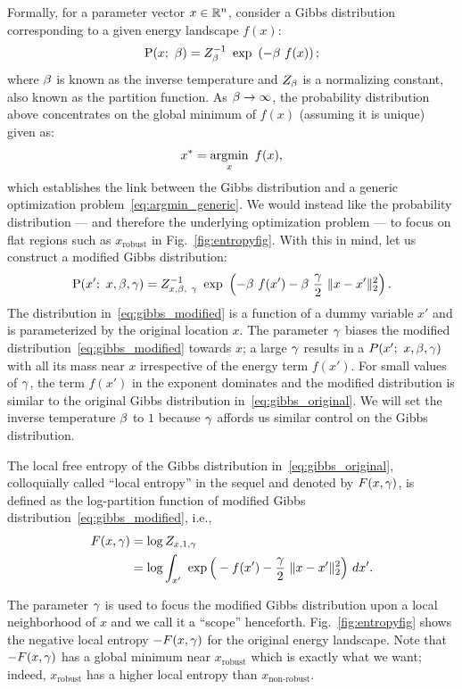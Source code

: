 \documentclass[10pt]{article}
\begin{document}
Formally, for a parameter vector $x \in \mathbb{R}^n$, consider a Gibbs distribution corresponding to a given energy landscape $f(x)$:
\begin{equation}
    \P(x;\ \b) = Z_\b^{-1}\ \exp\ \rbrac{-\b\ f(x)};
    \label{eq:gibbs_original}
\end{equation}
where $\beta$ is known as the inverse temperature and $Z_\beta$ is a normalizing constant, also known 
as the partition function. As $\beta \to \infty$, the probability distribution above concentrates on the global minimum of $f(x)$ (assuming it is unique) given as:
\begin{equation}
    x^* = \operatorname*{argmin}_x\ f(x),
    \label{eq:argmin_generic}
\end{equation}
which establishes the link between the Gibbs distribution and a generic optimization problem~\eqref{eq:argmin_generic}. We would instead like the probability distribution --- and therefore the underlying optimization problem --- to focus on flat regions such as $x_{\textrm{robust}}$ in Fig.~\ref{fig:entropyfig}. With this in mind, let us construct a modified Gibbs distribution:
\begin{equation}
    \P(x';\ x, \b, \g) = Z_{x,\b,\ \g}^{-1}\ \exp\ \rbrac{-\b\ f(x') - \b\ \f{\g}{2}\ \norm{x-x'}^2_2}.
    \label{eq:gibbs_modified}
\end{equation}
The distribution in~\eqref{eq:gibbs_modified} is a function of a dummy variable $x'$ and is parameterized by the original location $x$. The parameter $\gamma$ biases the modified distribution~\eqref{eq:gibbs_modified} towards $x$; a large $\gamma$ results in a $P(x';\ x,\beta,\gamma)$ with all its mass near $x$ irrespective of the energy term $f(x')$. For small values of $\gamma$, the term $f(x')$ in the exponent dominates and the modified distribution is similar to the original Gibbs distribution in~\eqref{eq:gibbs_original}. We will set the inverse temperature $\beta$ to $1$ because $\gamma$ affords us similar control on the Gibbs distribution.

\begin{definition}
\label{def:local_entropy}
The local free entropy of the Gibbs distribution in~\eqref{eq:gibbs_original}, colloquially called ``local entropy'' in the sequel and denoted by $F(x, \gamma)$, is defined as the log-partition function of modified Gibbs distribution~\eqref{eq:gibbs_modified}, i.e.,
\begin{align}
    F(x, \gamma) &= \log Z_{x, 1, \gamma} \notag\\
    &= \log \int_{x'}\ \exp \Big(-f(x') - \frac{\gamma}{2}\ \lVert x-x'\rVert^2_2 \Big)\ dx'.
    \label{eq:local_entropy}
\end{align}
\end{definition}
The parameter $\gamma$ is used to focus the modified Gibbs distribution upon a local neighborhood of $x$ and we call it a ``scope'' henceforth. Fig.~\ref{fig:entropyfig} shows the negative local entropy $-F(x, \gamma)$ for the original energy landscape. Note that $-F(x, \gamma)$ has a global minimum near $x_{\textrm{robust}}$ which is exactly what we want; indeed, $x_{\textrm{robust}}$ has a higher local entropy than $x_{\textrm{non-robust}}$.
\end{document}
